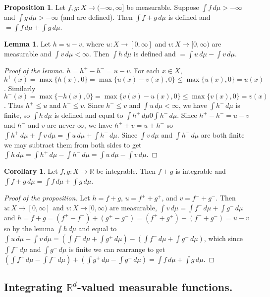 \documentclass{article}
\newcommand{\R}{\mathbb{R}}
\theoremstyle{definition}
\newtheorem{corollary}[theorem]{Corollary}
\newtheorem{lemma}[theorem]{Lemma}
\newtheorem{proposition}[theorem]{Proposition}
\begin{document}
\begin{proposition}
Let $f, g : X \longrightarrow (-\infty,\infty]$ be measurable. Suppose $\int f\,d\mu > -\infty$ and $\int g\,d\mu > -\infty$ (and are defined). Then $\int f + g\,d\mu$ is defined and $= \int f\,d\mu + \int g\,d\mu$.
\end{proposition}
\begin{lemma}
    Let $h = u - v$, where $u : X \longrightarrow [0, \infty]$ and $v : X \longrightarrow [0, \infty)$ are measurable and $\int v\,d\mu < \infty$. Then $\int h\,d\mu$ is defined and $= \int u\,d\mu - \int v\,d\mu$.
\end{lemma}
\begin{proof}[Proof of the lemma]
    $h = h^+ - h^- = u - v$. For each $x \in X$, $h^+(x) = \max\{h(x), 0\} = \max\{u(x)-v(x), 0\} \leq \max\{u(x), 0\} = u(x)$. Similarly $h^-(x) = \max\{-h(x), 0\} = \max\{v(x)-u(x), 0\} \leq \max\{v(x), 0\} = v(x)$. Thus $h^+ \leq u$ and $h^- \leq v$. Since $h^- \leq v$ and $\int u \,d\mu < \infty$, we have $\int h^-\,d\mu$ is finite, so $\int h\,d\mu$ is defined and equal to $\int h^+\,d\mu 0 \int h^-\,d\mu$. Since $h^+ - h^- = u - v$ and $h^-$ and $v$ are never $\infty$, we have $h^+ + v = u + h^-$ so $\int h^+ \,d\mu + \int v\,d\mu = \int u\,d\mu + \int h^-\,d\mu$. Since $\int v\,d\mu$ and $\int h^-\,d\mu$ are both finite we may subtract them from both sides to get $\int h\,d\mu = \int h^+\,d\mu - \int h^-\,d\mu = \int u\,d\mu - \int v\,d\mu$.
\end{proof}
\begin{corollary}
    Let $f,g : X \longrightarrow \R$ be integrable. Then $f + g$ is integrable and $\int f + g\,d\mu = \int f\,d\mu + \int g\,d\mu$.
\end{corollary}
\begin{proof}[Proof of the proposition]
    Let $h = f + g$, $u = f^+ + g^+$, and $v = f^- + g^-$. Then $u : X \longrightarrow [0, \infty]$ and $v : X \longrightarrow [0, \infty)$ are measurable, $\int v\,d\mu = \int f^-\,d\mu + \int g^-\,d\mu$ and $h = f + g = (f^+ - f^-) + (g^+ - g^-) = (f^+ + g^+) - (f^- + g^-) = u - v$ so by the lemma $\int h\,d\mu$ and equal to $\int u \,d\mu - \int v\,d\mu = (\int f^+ \,d\mu + \int g^+\,d\mu) - (\int f^-\,d\mu + \int g^-\,d\mu)$, which since $\int f^-\,d\mu$ and $\int g^-\,d\mu$ is finite we can rearrange to get $(\int f^+\,d\mu - \int f^-\,d\mu) + (\int g^+\,d\mu - \int g^-\,d\mu) = \int f\,d\mu + \int g\,d\mu$.
\end{proof}

\subsection*{Integrating $\R^d$-valued measurable functions.}
\end{document}
